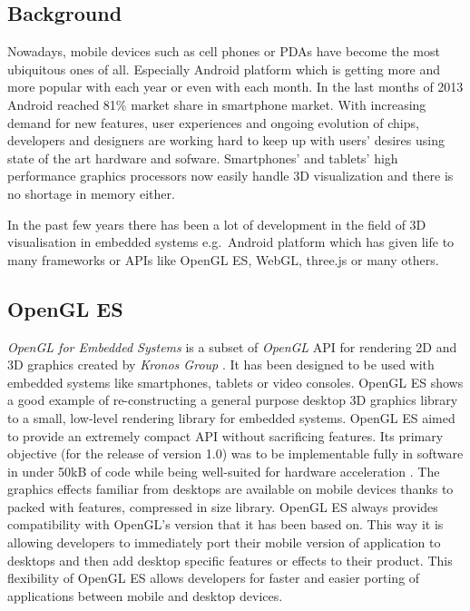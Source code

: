 \subsection{Background}
Nowadays, mobile devices such as cell phones or PDAs have become the most ubiquitous ones of all.
Especially Android platform which is getting more and more popular with each year or even with each month.
In the last months of 2013 Android reached 81\% market share in smartphone market.
With increasing demand for new features, user experiences and ongoing evolution of chips,  developers and designers are working hard to keep up with users' desires using state of the art hardware and sofware.
Smartphones’ and tablets’ high performance graphics processors now easily handle 3D visualization and there is no shortage in memory either.

In the past few years there has been a lot of development in the field of 3D visualisation in embedded systems e.g.\ Android platform which has given life to many frameworks or APIs like OpenGL ES, WebGL, three.js or many others.

\subsection{OpenGL ES}
\emph{OpenGL for Embedded Systems} \cite{opengles_kronos} is a subset of \emph{OpenGL} \cite{opengl_kronos} API for rendering 2D and 3D graphics created by \emph{Kronos Group} \cite{kronos_group}.
It has been designed to be used with embedded systems like smartphones, tablets or video consoles.
OpenGL ES shows a good example of re-constructing a general purpose desktop 3D graphics library to a small, low-level rendering library for embedded systems.
OpenGL ES aimed to provide an extremely compact API without sacrificing features.
Its primary objective (for the release of version 1.0) was to be implementable fully in software in under 50kB of code while being well-suited for hardware acceleration \cite{mobile_3d_graphics_with_OGLES_M3G}.
The graphics effects familiar from desktops are available on mobile devices thanks to packed with features, compressed in size library.
\newline OpenGL ES always provides compatibility with OpenGL's version that it has been based on.
This way it is allowing developers to immediately port their mobile version of application to desktops and then add desktop specific features or effects to their product.
This flexibility of OpenGL ES allows developers for faster and easier porting of applications between mobile and desktop devices.

